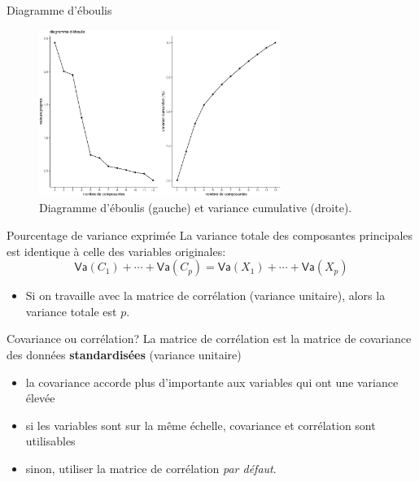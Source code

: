 \documentclass[
  ignorenonframetext,
]{beamer}
\providecommand{\tightlist}{%
  \setlength{\itemsep}{0pt}\setlength{\parskip}{0pt}}\usepackage{longtable,booktabs,array}
\begin{document}
\begin{frame}{Diagramme d'éboulis}
\protect\hypertarget{diagramme-duxe9boulis}{}
\begin{figure}

{\centering \includegraphics[width=0.7\textwidth,height=\textheight]{MATH60602-diapos3_files/figure-beamer/fig-screeplot-1.pdf}

}

\caption{\label{fig-screeplot}Diagramme d'éboulis (gauche) et variance
cumulative (droite).}

\end{figure}
\end{frame}

\begin{frame}{Pourcentage de variance exprimée}
\protect\hypertarget{pourcentage-de-variance-exprimuxe9e}{}
La variance totale des composantes principales est identique à celle des
variables originales:
\[ \mathsf{Va}(C_1) + \cdots + \mathsf{Va}(C_p) = \mathsf{Va}(X_1) + \cdots + \mathsf{Va}(X_p)\]

\begin{itemize}
\tightlist
\item
  Si on travaille avec la matrice de corrélation (variance unitaire),
  alors la variance totale est \(p\).
\end{itemize}
\end{frame}

\begin{frame}{Covariance ou corrélation?}
\protect\hypertarget{covariance-ou-corruxe9lation}{}
La matrice de corrélation est la matrice de covariance des données
\textbf{standardisées} (variance unitaire)

\begin{itemize}
\tightlist
\item
  la covariance accorde plus d'importante aux variables qui ont une
  variance élevée
\item
  si les variables sont sur la même échelle, covariance et corrélation
  sont utilisables
\item
  sinon, utiliser la matrice de corrélation \emph{par défaut}.
\end{itemize}
\end{frame}
\end{document}
